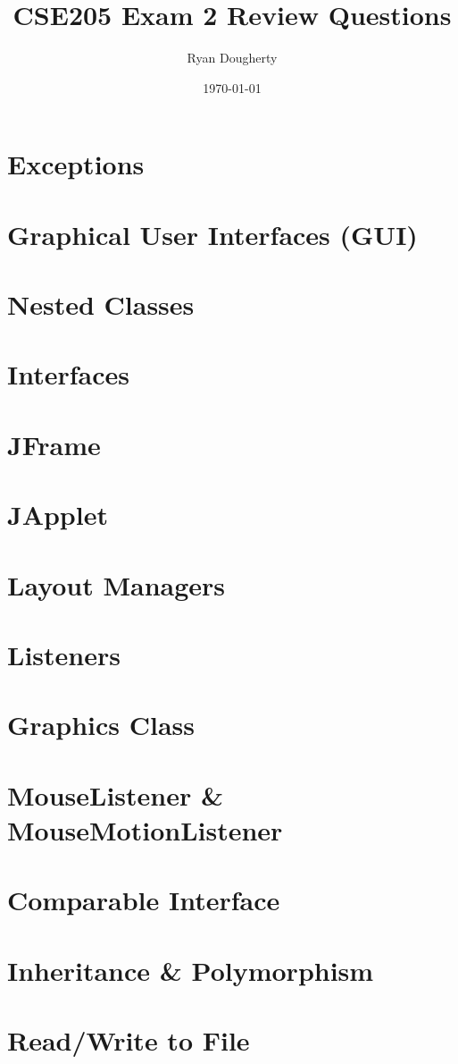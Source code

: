 \documentclass{article}
\title{CSE205 Exam 2 Review Questions}
\author{Ryan Dougherty}
\date{\today}
\begin{document}
\maketitle

\section{Exceptions}

\section{Graphical User Interfaces (GUI)}

\section{Nested Classes}

\section{Interfaces}

\section{JFrame}

\section{JApplet}

\section{Layout Managers}

\section{Listeners}

\section{Graphics Class}

\section{MouseListener \& MouseMotionListener}

\section{Comparable Interface}

\section{Inheritance \& Polymorphism}

\section{Read/Write to File}
\end{document}
